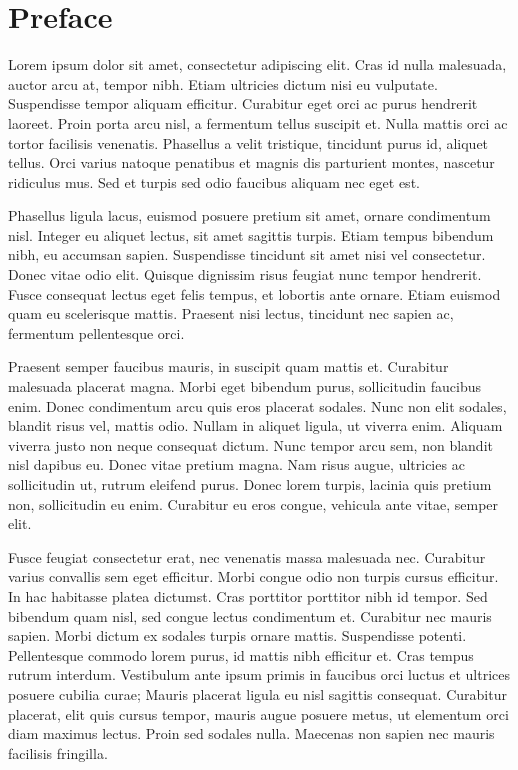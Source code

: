 \documentclass[]{article}
\numberwithin{equation}{section}
\begin{document}
\clearpage

\section*{Preface}

Lorem ipsum dolor sit amet, consectetur adipiscing elit. Cras id nulla malesuada, auctor arcu at, tempor nibh. Etiam ultricies dictum nisi eu vulputate. Suspendisse tempor aliquam efficitur. Curabitur eget orci ac purus hendrerit laoreet. Proin porta arcu nisl, a fermentum tellus suscipit et. Nulla mattis orci ac tortor facilisis venenatis. Phasellus a velit tristique, tincidunt purus id, aliquet tellus. Orci varius natoque penatibus et magnis dis parturient montes, nascetur ridiculus mus. Sed et turpis sed odio faucibus aliquam nec eget est.

Phasellus ligula lacus, euismod posuere pretium sit amet, ornare condimentum nisl. Integer eu aliquet lectus, sit amet sagittis turpis. Etiam tempus bibendum nibh, eu accumsan sapien. Suspendisse tincidunt sit amet nisi vel consectetur. Donec vitae odio elit. Quisque dignissim risus feugiat nunc tempor hendrerit. Fusce consequat lectus eget felis tempus, et lobortis ante ornare. Etiam euismod quam eu scelerisque mattis. Praesent nisi lectus, tincidunt nec sapien ac, fermentum pellentesque orci.

Praesent semper faucibus mauris, in suscipit quam mattis et. Curabitur malesuada placerat magna. Morbi eget bibendum purus, sollicitudin faucibus enim. Donec condimentum arcu quis eros placerat sodales. Nunc non elit sodales, blandit risus vel, mattis odio. Nullam in aliquet ligula, ut viverra enim. Aliquam viverra justo non neque consequat dictum. Nunc tempor arcu sem, non blandit nisl dapibus eu. Donec vitae pretium magna. Nam risus augue, ultricies ac sollicitudin ut, rutrum eleifend purus. Donec lorem turpis, lacinia quis pretium non, sollicitudin eu enim. Curabitur eu eros congue, vehicula ante vitae, semper elit.

Fusce feugiat consectetur erat, nec venenatis massa malesuada nec. Curabitur varius convallis sem eget efficitur. Morbi congue odio non turpis cursus efficitur. In hac habitasse platea dictumst. Cras porttitor porttitor nibh id tempor. Sed bibendum quam nisl, sed congue lectus condimentum et. Curabitur nec mauris sapien. Morbi dictum ex sodales turpis ornare mattis. Suspendisse potenti. Pellentesque commodo lorem purus, id mattis nibh efficitur et. Cras tempus rutrum interdum. Vestibulum ante ipsum primis in faucibus orci luctus et ultrices posuere cubilia curae; Mauris placerat ligula eu nisl sagittis consequat. Curabitur placerat, elit quis cursus tempor, mauris augue posuere metus, ut elementum orci diam maximus lectus. Proin sed sodales nulla. Maecenas non sapien nec mauris facilisis fringilla.
\end{document}
